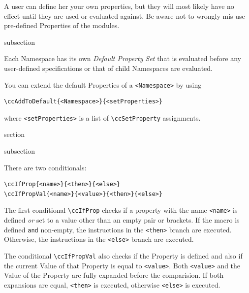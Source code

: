 A user can define her your own properties, but they will most likely
have no effect until they are used or evaluated against. Be aware not
to wrongly mis-use pre-defined Properties of the {\CoCoTeX}
modules.

\begin{Heading}{subsection}
\end{Heading}

Each Namespace has its own \textit{Default Property Set} that is
evaluated before any user-defined specifications or that of child
Namespaces are evaluated.

You can extend the default Properties of a \lstinline{<Namespace>} by
using
\begin{lstlisting}[style=tex]
\ccAddToDefault{<Namespace>}{<setProperties>}
\end{lstlisting}
where \lstinline{<setProperties>} is a list of \lstinline{\ccSetProperty}
assignments.\Hack{\newpage}

\begin{Heading}{section}
\end{Heading}

\begin{Heading}{subsection}
\end{Heading}

There are two conditionals:
\begin{lstlisting}[style=tex]
\ccIfProp{<name>}{<then>}{<else>}
\ccIfPropVal{<name>}{<value>}{<then>}{<else>}
\end{lstlisting}
The first conditional \lstinline{\ccIfProp} checks if a property with
the name \lstinline{<name>} is defined \textit{or} set to a value
other than an empty pair or brackets. If the macro is defined
\lstinline{and} non-empty, the instructions in the \lstinline{<then>}
branch are executed. Otherwise, the instructions in the
\lstinline{<else>} branch are executed.

The conditional \lstinline{\ccIfPropVal} also checks if the Property
is defined and also if the current Value of that Property is equal to
\lstinline{<value>}. Both \lstinline{<value>} and the Value of the
Property are fully expanded before the comparision. If both expansions
are equal, \lstinline{<then>} is executed, otherwise
\lstinline{<else>} is executed.

